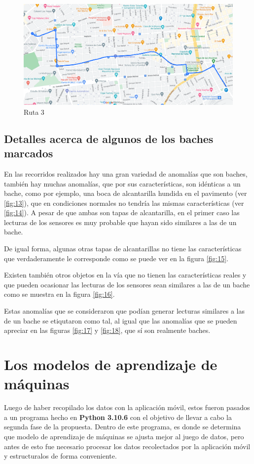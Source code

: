 	\begin{figure}[htb]
		\centering
		\includegraphics[scale = 0.4]{Graphics/route_3_EgidoArsenal_LyJovellarHotelColina.png}
		\caption{Ruta 3}
		\label{fig:12}
	\end{figure}

	\subsection{Detalles acerca de algunos de los baches marcados}
		En las recorridos realizados hay una gran variedad de anomalías que son baches, también hay muchas anomalías, que por sus características,
		son idénticas a un bache, como por ejemplo, una boca de alcantarilla hundida en el pavimento (ver \ref{fig:13}), que en condiciones normales no 
		tendría las mismas características (ver \ref{fig:14}). A pesar de que ambas son tapas de alcantarilla, en el primer caso las lecturas de los 
		sensores es muy probable que hayan sido similares a las de un bache.

		De igual forma, algunas otras tapas de alcantarillas no tiene las características que verdaderamente le corresponde como se puede ver en la
		figura \ref{fig:15}.

		Existen también otros objetos en la vía que no tienen las características reales y que pueden ocasionar las lecturas de los sensores sean similares
		a las de un bache como se muestra en la figura \ref{fig:16}.

		Estas anomalías que se consideraron que podían generar lecturas	similares a las de un bache se etiqutaron como tal, al igual que las anomalías que se 
		pueden apreciar en las figuras \ref{fig:17} y \ref{fig:18}, que sí son realmente baches.

\section{Los modelos de aprendizaje de máquinas}
	Luego de haber recopilado los datos con la aplicación móvil, estos fueron pasados a un programa hecho en \textbf{Python 3.10.6} con el objetivo de llevar a cabo 
	la segunda fase de la propuesta. Dentro de este programa, es donde se determina que modelo de aprendizaje de máquinas se ajusta mejor al juego de datos,
	pero antes de esto fue necesario procesar los datos recolectados por la aplicación móvil y estructuralos de forma conveniente. 

